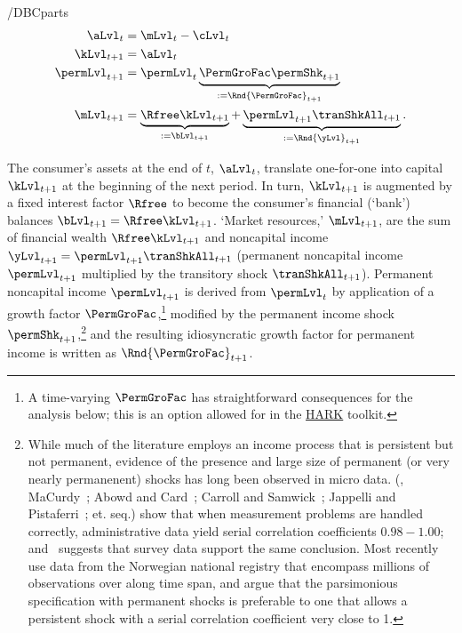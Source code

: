 \documentclass[\econtexRoot/BufferStockTheory]{subfiles}
\begin{document}
\begin{verbatimwrite}{\EqDir/DBCparts}
  \begin{equation}\label{eq:DBCparts} %
    \begin{aligned}
      \aLvl_{t}     & = \mLvl_{t}-\cLvl_{t}  \\
      \kLvl_{t+1}   & = \aLvl_{t} \notag \\
      \permLvl_{t+1}  & = \permLvl_{t} \underbrace{\PermGroFac\permShk_{t+1}}_{:= \Rnd{\PermGroFac}_{t+1}} \notag \\
      \mLvl_{t+1}  & =   \underbrace{\Rfree \kLvl_{t+1}}_{:= \bLvl_{t+1}}  +\underbrace{\permLvl_{t+1}\tranShkAll_{t+1}}_{:= \Rnd{\yLvl}_{t+1}}. \notag
    \end{aligned}
  \end{equation}
\end{verbatimwrite}\unskip


The consumer's assets at the end of $t$, $\aLvl_{t}$, translate one-for-one into capital $\kLvl_{t+1}$ at the beginning of the next period.
In turn, $\kLvl_{t+1}$ is augmented by a fixed interest factor $\Rfree$ to become the consumer's financial (`bank') balances $\bLvl_{t+1} = \Rfree \kLvl_{t+1}$.  `Market resources,' $\mLvl_{t+1}$,  are the sum of financial wealth $\Rfree \kLvl_{t+1}$ and noncapital income $\yLvl_{t+1}=\permLvl_{t+1}\tranShkAll_{t+1}$ (permanent noncapital income $\permLvl_{t+1}$ multiplied by the transitory shock $\tranShkAll_{t+1}$).
Permanent noncapital income $\permLvl_{t+1}$ is derived from $\permLvl_{t}$ by application of a growth factor $\PermGroFac$,\footnote{A time-varying $\PermGroFac$ has straightforward consequences for the analysis below; this is an option allowed for in the \href{https://econ-ark.org}{HARK} toolkit.} modified by the permanent income shock $\permShk_{t+1}$,\footnote{While much of the literature employs an income process that is persistent but not permanent, evidence of the presence and large size of permanent (or very nearly permanenent) shocks has long been observed in micro data.
  (\cite{lwComponents}, MaCurdy~\citeyearpar{macurdyTimeseries}; Abowd and Card~\citeyearpar{acCovariance}; Carroll and Samwick~\citeyearpar{csNature}; Jappelli and Pistaferri~\citeyear{jpCins}; et. seq.)
  \cite{dhmImproving} show that when measurement problems are handled correctly, administrative data yield serial correlation coefficients $0.98-1.00$; and~\cite{dmHowMuch} suggests that survey data support the same conclusion.  Most recently \cite{crawleyParsimonious} use data from the Norwegian national registry that encompass millions of observations over along time span, and argue that the parsimonious specification with permanent shocks is preferable to one that allows a persistent shock with a serial correlation coefficient very close to 1.
  } and the resulting idiosyncratic growth factor for permanent income is written as $\Rnd{\PermGroFac}_{t+1}$.
\end{document}

